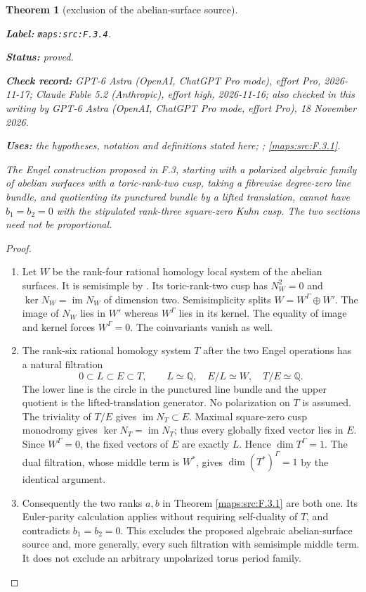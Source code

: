 \documentclass[11pt,a4paper]{article}
\newtheorem{theorem}{Theorem}[section]
\theoremstyle{definition}
\newcommand{\StatementRecord}[4]{\par\smallskip\begingroup\upshape\raggedright\noindent\textbf{Label:} \nolinkurl{#1}.\par\noindent\textbf{Status:} #2.\par\noindent\textbf{Check record:} #3.\par\noindent\textbf{Uses:} #4.\par\endgroup\smallskip}
\newcommand{\CurrentChecker}{GPT-6 Astra (OpenAI, ChatGPT Pro mode, effort Pro), 18 November 2026}
\begin{document}
\begin{theorem}[exclusion of the abelian-surface source]\label{maps:src:F.3.4}
\StatementRecord{maps:src:F.3.4}{proved}{GPT-6 Astra (OpenAI, ChatGPT Pro mode), effort Pro, 2026-11-17; Claude Fable 5.2 (Anthropic), effort high, 2026-11-16; also checked in this writing by \CurrentChecker}{the hypotheses, notation and definitions stated here; \cite[Definition 4.2.4 and Proposition 4.2.5, p.~44; Theorem 4.2.6, p.~45]{ffDeligne}; \cref{maps:src:F.3.1}}


The Engel construction proposed in F.3, starting with a polarized
algebraic family of abelian surfaces with a toric-rank-two cusp,
taking a fibrewise degree-zero line bundle, and quotienting its
punctured bundle by a lifted translation, cannot have $b_1=b_2=0$
with the stipulated rank-three square-zero Kuhn cusp.
The two sections need not be proportional.

\end{theorem}


\begin{proof}
\begin{enumerate}[label=\arabic*.]
\item Let $W$ be the rank-four rational homology local system of the
abelian surfaces.  It is semisimple by
\cite[Definition 4.2.4 and Proposition 4.2.5, p.~44; Theorem 4.2.6, p.~45]{ffDeligne}.
Its toric-rank-two cusp has
$N_W^2=0$ and $\ker N_W=\operatorname{im}N_W$ of dimension two.
Semisimplicity splits $W=W^\Gamma\oplus W'$.
The image of $N_W$ lies in $W'$ whereas $W^\Gamma$ lies in its
kernel.  The equality of image and kernel forces $W^\Gamma=0$.
The coinvariants vanish as well.

\item The rank-six rational homology system $T$ after the two Engel
operations has a natural filtration
\[
 0\subset L\subset E\subset T,\qquad
 L\simeq\mathbb Q,\quad E/L\simeq W,\quad T/E\simeq\mathbb Q.
\]
The lower line is the circle in the punctured line bundle and
the upper quotient is the lifted-translation generator.
No polarization on $T$ is assumed.
The triviality of $T/E$ gives $\operatorname{im}N_T\subset E$.
Maximal square-zero cusp monodromy gives
$\ker N_T=\operatorname{im}N_T$; thus every globally fixed vector
lies in $E$.  Since $W^\Gamma=0$, the fixed vectors of $E$ are
exactly $L$.  Hence $\dim T^\Gamma=1$.
The dual filtration, whose middle term is $W^*$, gives
$\dim(T^*)^\Gamma=1$ by the identical argument.

\item Consequently the two ranks $a,b$ in Theorem \ref{maps:src:F.3.1} are both one.
Its Euler-parity calculation applies without requiring self-duality
of $T$, and contradicts $b_1=b_2=0$.
This excludes the proposed algebraic abelian-surface source and,
more generally, every such filtration with semisimple middle term.
It does not exclude an arbitrary unpolarized torus period family.

\end{enumerate}
\end{proof}
\end{document}
